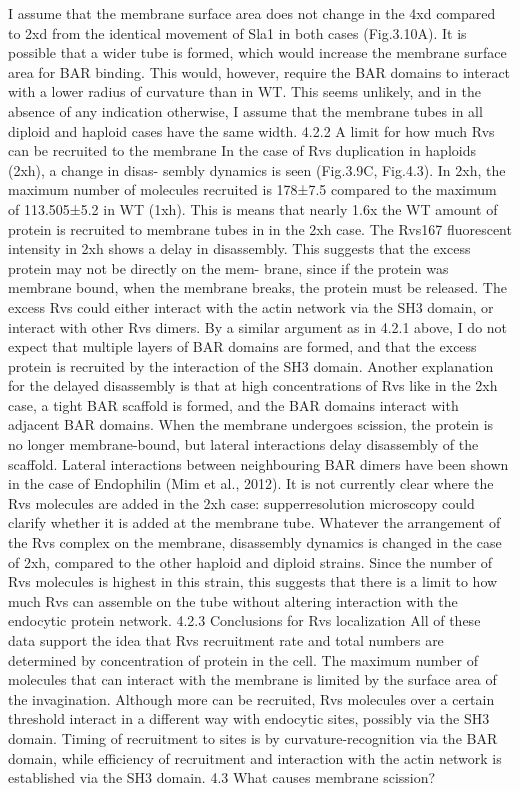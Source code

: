 \documentclass[9pt,lineno]{elife}
\begin{document}
I assume that the membrane surface area does not change in the 4xd compared to 2xd from the identical movement of Sla1 in both cases (Fig.3.10A). It is possible that a wider tube is formed, which would increase the membrane surface area for BAR binding. This would, however, require the BAR domains to interact with a lower radius of curvature than in WT. This seems unlikely, and in the absence of any indication otherwise, I assume that the membrane tubes in all diploid and haploid cases have the same width.
4.2.2 A limit for how much Rvs can be recruited to the membrane
In the case of Rvs duplication in haploids (2xh), a change in disas- sembly dynamics is seen (Fig.3.9C, Fig.4.3). In 2xh, the maximum number of molecules recruited is 178±7.5 compared to the maximum of 113.505±5.2 in WT (1xh). This is means that nearly 1.6x the WT amount of protein is recruited to membrane tubes in in the 2xh case. The Rvs167 fluorescent intensity in 2xh shows a delay in disassembly. This suggests that the excess protein may not be directly on the mem- brane, since if the protein was membrane bound, when the membrane breaks, the protein must be released. The excess Rvs could either interact with the actin network via the SH3 domain, or interact with other Rvs dimers. By a similar argument as in 4.2.1 above, I do not expect that multiple layers of BAR domains are formed, and that the excess protein is recruited by the interaction of the SH3 domain.
Another explanation for the delayed disassembly is that at high concentrations of Rvs like in the 2xh case, a tight BAR scaffold is formed, and the BAR domains interact with adjacent BAR domains. When the membrane undergoes scission, the protein is no longer membrane-bound, but lateral interactions delay disassembly of the scaffold. Lateral interactions between neighbouring BAR dimers have been shown in the case of Endophilin (Mim et al., 2012). It is not currently clear where the Rvs molecules are added in the 2xh case: supperresolution microscopy could clarify whether it is added at the membrane tube.
Whatever the arrangement of the Rvs complex on the membrane, disassembly dynamics is changed in the case of 2xh, compared to the other haploid and diploid strains. Since the number of Rvs molecules is highest in this strain, this suggests that there is a limit to how much Rvs can assemble on the tube without altering interaction with the endocytic protein network. 4.2.3 Conclusions for Rvs localization
All of these data support the idea that Rvs recruitment rate and total numbers are determined by concentration of protein in the cell. The maximum number of molecules that can interact with the membrane is limited by the surface area of the invagination. Although more can be recruited, Rvs molecules over a certain threshold interact in a different way with endocytic sites, possibly via the SH3 domain. Timing of recruitment to sites is by curvature-recognition via the BAR domain, while efficiency of recruitment and interaction with the actin network is established via the SH3 domain. 4.3 What causes membrane scission?
\end{document}
